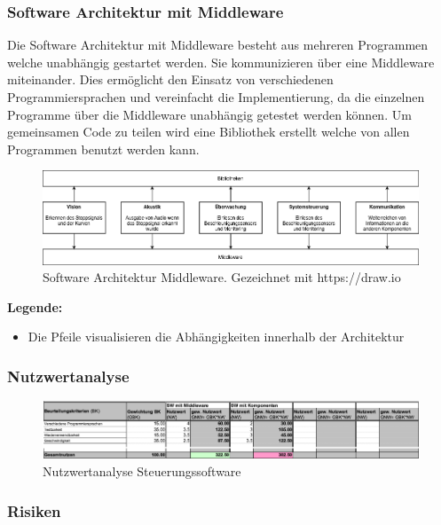 \documentclass[../../../main.tex]{subfiles}
\begin{document}
\subsubsection{Software Architektur mit Middleware}
Die Software Architektur mit Middleware besteht aus mehreren Programmen welche unabhängig gestartet werden.
Sie kommunizieren über eine Middleware miteinander.
Dies ermöglicht den Einsatz von verschiedenen Programmiersprachen und vereinfacht die Implementierung,
da die einzelnen Programme über die Middleware unabhängig getestet werden können.
Um gemeinsamen Code zu teilen wird eine Bibliothek erstellt welche von allen Programmen benutzt werden kann.

\begin{figure}[H] %
    \centering
    \includegraphics[width=1.0\textwidth]{drawings/ArchitekturDiagramm/SW_Architektur_Middleware.png}
    \caption {Software Architektur Middleware. Gezeichnet mit https://draw.io}
\end{figure}

\textbf{Legende:}
\begin{itemize}
    \item Die Pfeile visualisieren die Abhängigkeiten innerhalb der Architektur
\end{itemize}

\subsubsection{Nutzwertanalyse}
\begin{figure}[H]
    \centering
    \includegraphics[width=1.0\textwidth]{images/Steuerungssoftware/Nutzwertanalyse_Steuerungssoftware.png}
    \caption {Nutzwertanalyse Steuerungssoftware}
\end{figure}

\subsubsection{Risiken}
\end{document}
